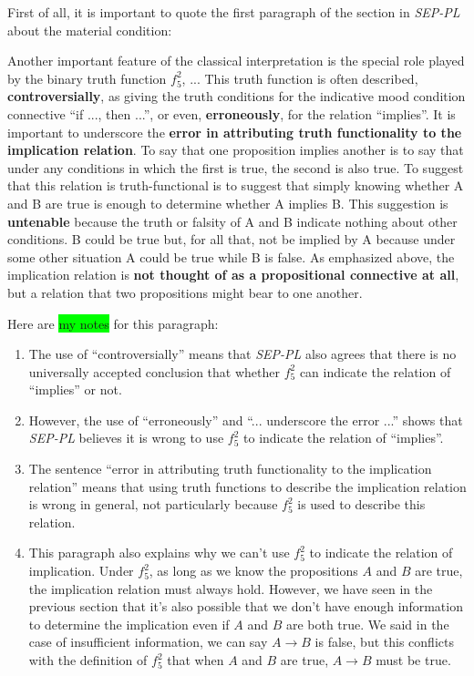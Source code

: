 \documentclass[12pt, letterpaper]{article}
\begin{document}
First of all, it is important to quote the first paragraph of the section in
\textit{SEP-PL} about the material condition:

\begin{displayquote}
  Another important feature of the classical interpretation is the special role
  played by the binary truth function $f_5^2$, ... This truth function is often
  described, \textbf{controversially}, as giving the truth conditions for the
  indicative mood condition connective ``if ..., then ...'', or even,
  \textbf{erroneously}, for the relation ``implies''. It is important to
  underscore the \textbf{error in attributing truth functionality to the
    implication relation}. To say that one proposition implies another is to say
  that under any conditions in which the first is true, the second is also
  true. To suggest that this relation is truth-functional is to suggest that
  simply knowing whether A and B are true is enough to determine whether A
  implies B. This suggestion is \textbf{untenable} because the truth or falsity
  of A and B indicate nothing about other conditions. B could be true but, for
  all that, not be implied by A because under some other situation A could be
  true while B is false. As emphasized above, the implication relation is
  \textbf{not thought of as a propositional connective at all}, but a relation
  that two propositions might bear to one another.
\end{displayquote}

Here are \colorbox{lime}{my notes} for this paragraph:
\begin{enumerate}
  \item The use of ``controversially'' means that \textit{SEP-PL} also agrees
        that there is no universally accepted conclusion that whether $f_5^2$ can
        indicate the relation of ``implies'' or not.
  \item However, the use of ``erroneously'' and ``... underscore the error ...''
        shows that \textit{SEP-PL} believes it is wrong to use $f_5^2$ to indicate
        the relation of ``implies''.
  \item The sentence ``error in attributing truth functionality to the
        implication relation'' means that using truth functions to describe the
        implication relation is wrong in general, not particularly because $f_5^2$
        is used to describe this relation.
  \item This paragraph also explains why we can't use $f_5^2$ to indicate the
        relation of implication. Under $f_5^2$, as long as we know the propositions
        $A$ and $B$ are true, the implication relation must always hold. However,
        we have seen in the previous section that it's also possible that we don't
        have enough information to determine the implication even if $A$ and $B$
        are both true. We said in the case of insufficient information, we can say
        $A \rightarrow B$ is false, but this conflicts with the definition of
        $f_5^2$ that when $A$ and $B$ are true, $A \rightarrow B$ must be true.
\end{enumerate}
\end{document}
